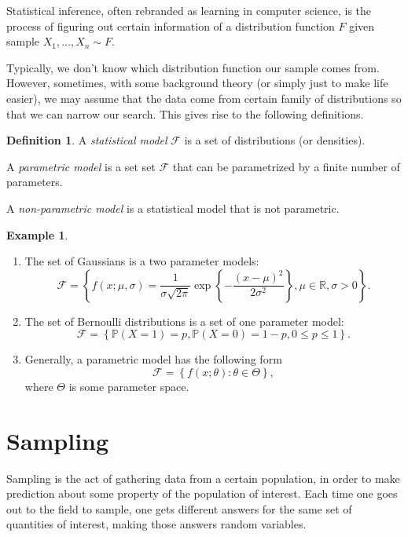 \documentclass[
  openany]{book}
\theoremstyle{definition}
\newtheorem{definition}{Definition}[chapter]
\theoremstyle{definition}
\newtheorem{example}{Example}[chapter]
\theoremstyle{definition}
\theoremstyle{definition}
\theoremstyle{remark}
\begin{document}
Statistical inference, often rebranded as learning in computer science, is the process
of figuring out certain information of a distribution function \(F\) given
sample \(X_1, \dots, X_n \sim F\).

Typically, we don't know which distribution function our sample comes from.
However, sometimes, with some background theory (or simply just to make life easier),
we may assume that the data come from certain family of distributions so that
we can narrow our search.
This gives rise to the following definitions.

\begin{definition}
A \emph{statistical model} \(\mathcal{F}\) is a set of distributions (or densities).

A \emph{parametric model} is a set set \(\mathcal{F}\) that can be parametrized
by a finite number of parameters.

A \emph{non-parametric model} is a statistical model that is not parametric.
\end{definition}

\begin{example}
\leavevmode

\begin{enumerate}
\def\labelenumi{\arabic{enumi}.}
\item
  The set of Gaussians is a two parameter models:
  \[ \mathcal{F} = \left\{ f(x; \mu, \sigma) = \frac{1}{\sigma \sqrt{2 \pi}} \exp\left\{ -\frac{(x-\mu)^2}{2\sigma^2}  \right\}, \mu \in \mathbb{R}, \sigma > 0   \right\}. \]
\item
  The set of Bernoulli distributions is a set of one parameter model:
  \[ \mathcal{F} = \left\{ \mathbb{P}(X = 1) = p, \mathbb{P}(X = 0) = 1 -p, 0\leq p \leq 1   \right\}.\]
\item
  Generally, a parametric model has the following form
  \[\mathcal{F} = \left\{ f(x;\theta) : \theta \in \Theta  \right\} ,\]
  where \(\Theta\) is some parameter space.
\end{enumerate}

\end{example}

\chapter{Sampling}\label{sampling}

Sampling is the act of gathering data from a certain
population, in order to make prediction about some property
of the population of interest.
Each time one goes out to the field to sample, one gets different
answers for the same set of quantities of interest, making those
answers random variables.
\end{document}
